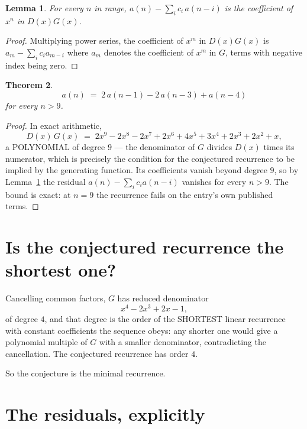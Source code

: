 \documentclass[11pt,a4paper]{article}
\theoremstyle{plain}
\newtheorem{theorem}{Theorem}
\newtheorem{lemma}[theorem]{Lemma}
\theoremstyle{definition}
\begin{document}
\begin{lemma}\label{lem:key}
For every $n$ in range, $a(n)-\sum_i c_i\,a(n-i)$ is the coefficient of $x^{n}$ in
$D(x)G(x)$.
\end{lemma}

\begin{proof}
Multiplying power series, the coefficient of $x^{m}$ in $D(x)G(x)$ is
$a_m-\sum_i c_i a_{m-i}$ where $a_m$ denotes the coefficient of $x^{m}$ in $G$, terms with
negative index being zero.
\end{proof}

\begin{theorem}
\[
a(n)\;=\;2\,a(n-1) - 2\,a(n-3) + a(n-4)
\]
for every $n>9$.
\end{theorem}

\begin{proof}
In exact arithmetic,
\[
D(x)\,G(x)\;=\;2 x^{9} - 2 x^{8} - 2 x^{7} + 2 x^{6} + 4 x^{5} + 3 x^{4} + 2 x^{3} + 2 x^{2} + x,
\]
a POLYNOMIAL of degree $9$ --- the denominator of $G$ divides $D(x)$ times its numerator,
which is precisely the condition for the conjectured recurrence to be implied by the
generating function. Its coefficients vanish beyond degree $9$, so by
Lemma~\ref{lem:key} the residual $a(n)-\sum_ic_ia(n-i)$ vanishes for every
$n>9$. The bound is exact: at $n=9$ the recurrence fails on the entry's own published terms.
\end{proof}

\section{Is the conjectured recurrence the shortest one?}

Cancelling common factors, $G$ has reduced denominator
\[
x^{4} - 2 x^{3} + 2 x - 1,
\]
of degree $4$, and that degree is the order of the SHORTEST linear recurrence with
constant coefficients the sequence obeys: any shorter one would give a polynomial multiple of
$G$ with a smaller denominator, contradicting the cancellation. The conjectured recurrence has
order $4$.

So the conjecture is the minimal recurrence.

\section{The residuals, explicitly}
\end{document}
